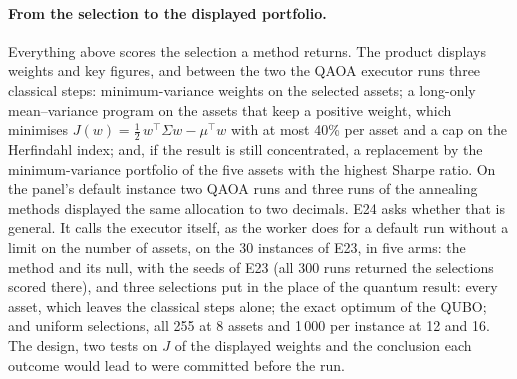 \documentclass[11pt,a4paper]{article}
\begin{document}
\paragraph{From the selection to the displayed portfolio.} Everything above
scores the selection a method returns. The product displays weights and key
figures, and between the two the QAOA executor runs three classical steps:
minimum-variance weights on the selected assets; a long-only mean--variance
program on the assets that keep a positive weight, which minimises
$J(w) = \tfrac12\,w^\top\Sigma w - \mu^\top w$ with at most 40\% per asset
and a cap on the Herfindahl index; and, if the result is still concentrated,
a replacement by the minimum-variance portfolio of the five assets with the
highest Sharpe ratio. On the panel's default instance two QAOA runs and three
runs of the annealing methods displayed the same allocation to two decimals.
E24 asks whether that is general. It calls the executor itself, as the worker
does for a default run without a limit on the number of assets, on the 30
instances of E23, in five arms: the method and its null, with the seeds of
E23 (all 300 runs returned the selections scored there), and three selections
put in the place of the quantum result: every asset, which leaves the
classical steps alone; the exact optimum of the QUBO; and uniform selections,
all 255 at 8 assets and 1\,000 per instance at 12 and 16. The design, two
tests on $J$ of the displayed weights and the conclusion each outcome would
lead to were committed before the run.
\end{document}
